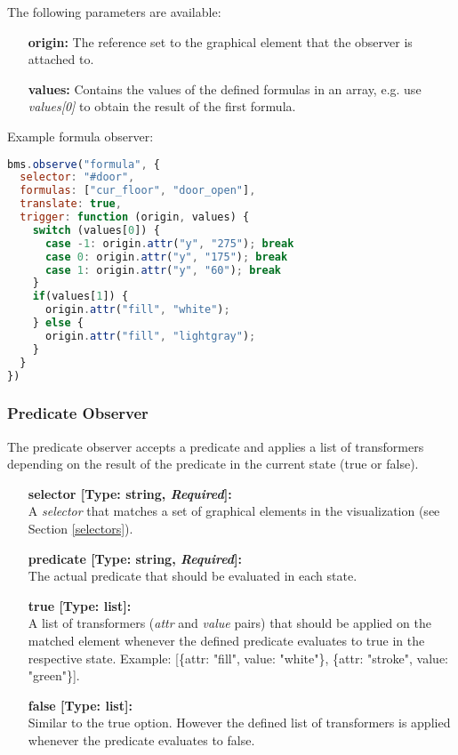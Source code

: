 \begin{itemize}
The following parameters are available:

\begin{itemize}
	\item[\textbf{origin:}] The reference set to the graphical element that the observer is attached to.
	\item[\textbf{values:}] Contains the values of the defined formulas in an array, e.g. use \textit{values[0]} to obtain the result of the first formula.
\end{itemize}
 
\end{itemize}

Example formula observer:

\begin{lstlisting}[language=JavaScript]
bms.observe("formula", {
  selector: "#door",
  formulas: ["cur_floor", "door_open"],
  translate: true,
  trigger: function (origin, values) {
    switch (values[0]) {
      case -1: origin.attr("y", "275"); break
      case 0: origin.attr("y", "175"); break
      case 1: origin.attr("y", "60"); break
    }
    if(values[1]) {
      origin.attr("fill", "white");
    } else {
      origin.attr("fill", "lightgray");
    }
  }
})
\end{lstlisting}

\subsubsection{Predicate Observer}

The predicate observer accepts a predicate and applies a list of transformers depending on the result of the predicate in the current state (true or false).

\begin{itemize}
\item[] \textbf{selector [Type: string, \textit{Required}]:}\\ A \textit{selector} that matches a set of graphical elements in the visualization (see Section \ref{selectors}).

	\item[] \textbf{predicate [Type: string, \textit{Required}]:}\\ The actual predicate that should be evaluated in each state.
	\item[] \textbf{true [Type: list]:}\\ A list of transformers (\textit{attr} and \textit{value} pairs) that should be applied on the matched element whenever the defined predicate evaluates to true in the respective state. Example: 
  [\{attr: "fill", value: "white"\}, \{attr: "stroke", value: "green"\}].
	\item[] \textbf{false [Type: list]:}\\ Similar to the true option.
	However the defined list of transformers is applied whenever the predicate evaluates to false.
\end{itemize}

